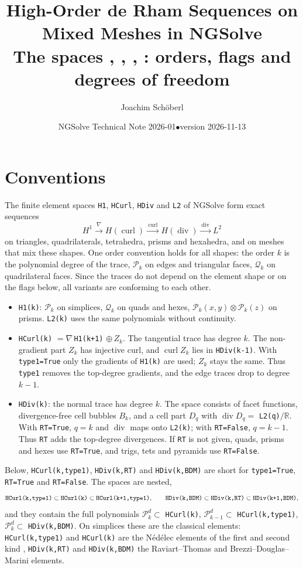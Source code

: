 \documentclass[10pt,a4paper]{article}
\title{\vspace{-1.2cm}High-Order de Rham Sequences on Mixed Meshes in NGSolve\\[2pt]
\large The spaces \code{H1}, \code{HCurl}, \code{HDiv}, \code{L2}: orders, flags and degrees of freedom}
\author{Joachim Sch\"oberl}
\date{NGSolve Technical Note 2026-01\quad$\bullet$\quad version 2026-11-13}
\newcommand{\code}[1]{\texttt{#1}}
\newcommand{\Pp}{\mathcal P}\newcommand{\Qq}{\mathcal Q}
\newcommand{\curl}{\operatorname{curl}}\renewcommand{\div}{\operatorname{div}}
\begin{document}
\maketitle\vspace{-0.9cm}

\section{Conventions}

The finite element spaces \code{H1}, \code{HCurl}, \code{HDiv} and \code{L2} of NGSolve form exact sequences
\[
  H^1 \xrightarrow{\ \nabla\ } H(\curl) \xrightarrow{\ \curl\ } H(\div) \xrightarrow{\ \div\ } L^2
\]
on triangles, quadrilaterals, tetrahedra, prisms and hexahedra, and on meshes that mix these shapes.
One order convention holds for all shapes: the order $k$ is the polynomial degree of the trace, $\Pp_k$ on edges and triangular faces, $\Qq_k$ on quadrilateral faces. Since the traces do not depend on the element shape or on the flags below, all variants are conforming to each other.

\begin{itemize}\setlength\itemsep{1pt}
\item \code{H1(k)}: $\Pp_k$ on simplices, $\Qq_k$ on quads and hexes, $\Pp_k(x,y)\otimes\Pp_k(z)$ on prisms. \code{L2(k)} uses the same polynomials without continuity.
\item \code{HCurl(k)} $= \nabla\,$\code{H1(k+1)} $\oplus\, Z_k$. The tangential trace has degree $k$. The non-gradient part $Z_k$ has injective curl, and $\curl Z_k$ lies in \code{HDiv(k-1)}. With \code{type1=True} only the gradients of \code{H1(k)} are used; $Z_k$ stays the same. Thus \code{type1} removes the top-degree gradients, and the edge traces drop to degree $k-1$.
\item \code{HDiv(k)}: the normal trace has degree $k$. The space consists of facet functions, divergence-free cell bubbles $B_k$, and a cell part $D_q$ with $\div D_q = $ \code{L2(q)}$/\mathbb R$. With \code{RT=True}, $q=k$ and $\div$ maps onto \code{L2(k)}; with \code{RT=False}, $q=k-1$. Thus \code{RT} adds the top-degree divergences. If \code{RT} is not given, quads, prisms and hexes use \code{RT=True}, and trigs, tets and pyramids use \code{RT=False}.
\end{itemize}
Below, \code{HCurl(k,type1)}, \code{HDiv(k,RT)} and \code{HDiv(k,BDM)} are short for \code{type1=True}, \code{RT=True} and \code{RT=False}.
The spaces are nested,
\[
\text{\code{HCurl(k,type1)}} \subset \text{\code{HCurl(k)}} \subset \text{\code{HCurl(k+1,type1)}},\qquad
\text{\code{HDiv(k,BDM)}} \subset \text{\code{HDiv(k,RT)}} \subset \text{\code{HDiv(k+1,BDM)}},
\]
and they contain the full polynomials $\Pp_k^d \subset$ \code{HCurl(k)}, $\Pp_{k-1}^d\subset$ \code{HCurl(k,type1)}, $\Pp_k^d\subset$ \code{HDiv(k,BDM)}.
On simplices these are the classical elements: \code{HCurl(k,type1)} and \code{HCurl(k)} are the N\'ed\'elec elements of the first \cite{ned80} and second kind \cite{ned86}, \code{HDiv(k,RT)} and \code{HDiv(k,BDM)} the Raviart--Thomas and Brezzi--Douglas--Marini elements.
\end{document}
